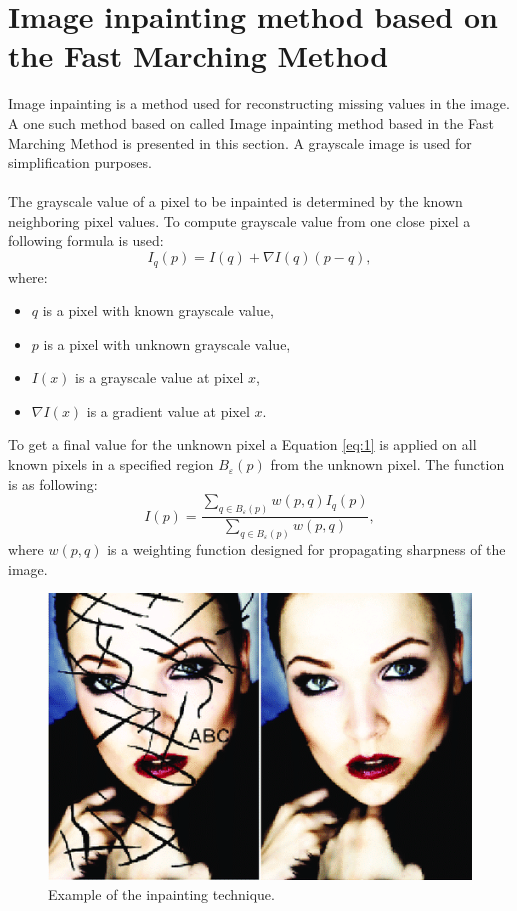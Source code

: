 \documentclass[twoside]{ctuthesis}
\theoremstyle{plain}
\theoremstyle{definition}
\theoremstyle{note}
\begin{document}
\section{Image inpainting method based on the Fast Marching Method} \label{inpainting}
Image inpainting is a method used for reconstructing missing values in the image. A one such method based on  called Image inpainting method based in the Fast Marching Method is presented in this section. A grayscale image is used for simplification purposes.\\
\\
The grayscale value of a pixel to be inpainted is determined by the known neighboring pixel values. To compute grayscale value from one close pixel a following formula is used:
\begin{equation} \label{eq:1}
	I_q(p)=I(q)+\nabla I(q)(p-q),
\end{equation}
where:
\begin{itemize}
	\item $q$ is a pixel with known grayscale value,
	\item $p$ is a pixel with unknown grayscale value,
	\item $I(x)$ is a grayscale value at pixel $x$,
	\item $\nabla I(x)$ is a gradient value at pixel $x$.
\end{itemize}
To get a final value for the unknown pixel a Equation \ref{eq:1} is applied on all known pixels in a specified region $B_{\varepsilon}(p)$ from the unknown pixel. The function is as following:
\begin{equation}
	I(p)=\frac{\sum_{q\in B_{\varepsilon}(p)}w(p,q)I_q(p)}{\sum_{q\in B_{\varepsilon}(p)}w(p,q)},
\end{equation}
where $w(p,q)$ is a weighting function designed for propagating sharpness of the image.\\
\begin{figure}[h!]
	\caption{Example of the inpainting technique.}
	\includegraphics[width=\textwidth]{inpaint_example.png}
	\centering
\end{figure}\\
\end{document}
